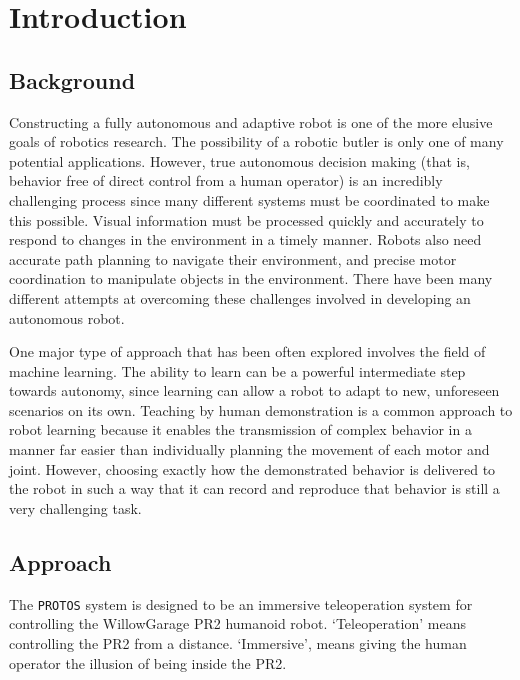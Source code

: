 \documentclass{sig-alternate}
\begin{document}
\section{Introduction}
\label{sec:intro}
\subsection{Background}
\indent Constructing a fully autonomous and adaptive robot is one of the more
elusive goals of robotics research.
The possibility of a robotic butler is only one of many potential applications.
However, true autonomous decision making (that is, behavior free of direct 
control from a human operator) is an incredibly challenging process since many 
different systems must 
be coordinated to make this possible. Visual information must be processed 
quickly and accurately to respond to changes in the environment in a timely
manner. Robots also need accurate path planning to navigate their environment,
 and precise motor coordination to manipulate objects in the environment. 
 There have been many different attempts at overcoming these challenges 
involved in developing an autonomous robot.

\indent One major type of approach 
that has been often explored involves the field of machine learning. The ability to learn can be a powerful intermediate 
step towards autonomy, since learning can allow a robot to adapt to new, unforeseen scenarios on its own. 
Teaching by human demonstration is a common approach to robot learning because it enables the 
transmission of complex behavior in a manner far easier than individually planning the movement of each motor and joint. However, choosing exactly how the demonstrated behavior is delivered to the robot in such a way that it can record and reproduce that behavior is still a very challenging task.

\subsection{Approach}
\indent The {\tt PROTOS} system is designed to be an immersive teleoperation system for controlling the WillowGarage PR2 humanoid robot. `Teleoperation' means controlling the PR2 from
a distance. `Immersive', means giving the human operator the illusion of being inside the PR2.
\end{document}
